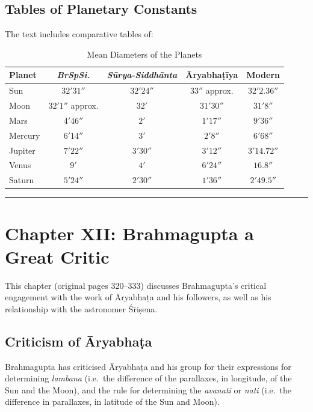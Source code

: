 \documentclass[11pt,a4paper]{article}
\newcommand{\longline}{\noindent\rule{\textwidth}{0.4pt}}
\theoremstyle{definition}
\begin{document}
\vspace{0.3cm}

\subsection{Tables of Planetary Constants}

The text includes comparative tables of:

\begin{table}[htbp]
\centering
\caption{Mean Diameters of the Planets}
\begin{tabular}{lcccc}
\toprule
Planet & \textit{BrSpSi.} & \textit{S\=urya-Siddh\=anta} & \=Aryabha\d{t}\=iya & Modern \\
\midrule
Sun & $32'31''$ & $32'24''$ & $33''$ approx. & $32'2.36''$ \\
Moon & $32'1''$ approx. & $32'$ & $31'30''$ & $31'8''$ \\
Mars & $4'46''$ & $2'$ & $1'17''$ & $9'36''$ \\
Mercury & $6'14''$ & $3'$ & $2'8''$ & $6'68''$ \\
Jupiter & $7'22''$ & $3'30''$ & $3'12''$ & $3'14.72''$ \\
Venus & $9'$ & $4'$ & $6'24''$ & $16.8''$ \\
Saturn & $5'24''$ & $2'30''$ & $1'36''$ & $2'49.5''$ \\
\bottomrule
\end{tabular}
\end{table}

\longline

\section{Chapter XII: Brahmagupta a Great Critic}
\label{sec:critic}

This chapter (original pages 320--333) discusses Brahmagupta's critical engagement with the work of \=Aryabha\d{t}a and his followers, as well as his relationship with the astronomer \'S\=ri\d{s}ena.

\subsection{Criticism of \=Aryabha\d{t}a}

Brahmagupta has criticised \=Aryabha\d{t}a and his group for their expressions for determining \textit{lambana} (i.e.\ the difference of the parallaxes, in longitude, of the Sun and the Moon), and the rule for determining the \textit{avanati} or \textit{nati} (i.e.\ the difference in parallaxes, in latitude of the Sun and Moon).
\end{document}
